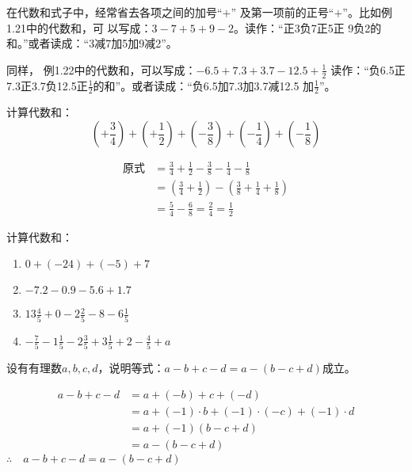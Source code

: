 在代数和式子中，经常省去各项之间的加号“$+$”
及第一项前的正号“$+$”。比如例1.21中的代数和，可
以写成：$3-7+5+9-2$。读作：“正3负7正5正
9负2的和。”或者读成：“3减7加5加9减2”。

同样，
例1.22中的代数和，可以写成：$-6.5+7.3+3.7-12.5+\frac{1}{2}$
读作：“负6.5正7.3正3.7负12.5正$\frac{1}{2}$的和”。或者读成：“负6.5加7.3加3.7减12.5
加$\frac{1}{2}$”。




\begin{example}
	计算代数和：
	\[\left(+\frac{3}{4}\right)+\left(+\frac{1}{2}\right)+\left(-\frac{3}{8}\right)+\left(-\frac{1}{4}\right)+\left(-\frac{1}{8}\right)  \]   
\end{example}


\begin{solution}
	\begin{align*}
	\text{原式}&=\frac{3}{4}+\frac{1}{2}-\frac{3}{8}-\frac{1}{4}-\frac{1}{8}  \tag{简化代数和}\\
	&=\left(\frac{3}{4}+\frac{1}{2}\right)-\left(\frac{3}{8}+\frac{1}{4}+\frac{1}{8}\right)\\
	&=\frac{5}{4}-\frac{6}{8}=\frac{2}{4}=\frac{1}{2}
	\end{align*}  
\end{solution}

\begin{ex}
	计算代数和：
	\begin{enumerate}
		\item $0+(-24)+(-5)+7$
		\item $-7.2-0.9-5.6+1.7$
		\item $13\frac{4}{5}+0-2\frac{2}{5}-8-6\frac{1}{5}$
		\item $-\frac{7}{5}-1\frac{1}{5}-2\frac{3}{5}+3\frac{1}{5}+2-\frac{4}{5}+a$
	\end{enumerate} 
\end{ex}

\begin{example}
	设有有理数$a,b,c,d$，说明等式：$a-b+c-d=a-(b-c+d)$成立。
\end{example}

\begin{solution}
	\begin{align*}
	a-b+c-d&= a+(-b)+c+(-d) \tag{代数和原意}\\
	&=a+ (-1)\cdot b+(-1)\cdot (-c)+(-1)\cdot d  \tag{相反数意义}\\
	&=a+(-1)(b-c+d) \tag{分配律}\\
	&=a-(b-c+d)  \tag{相反数意义}    
	\end{align*}    
	$\therefore\quad a-b+c-d=a-(b-c+d)$
\end{solution}

